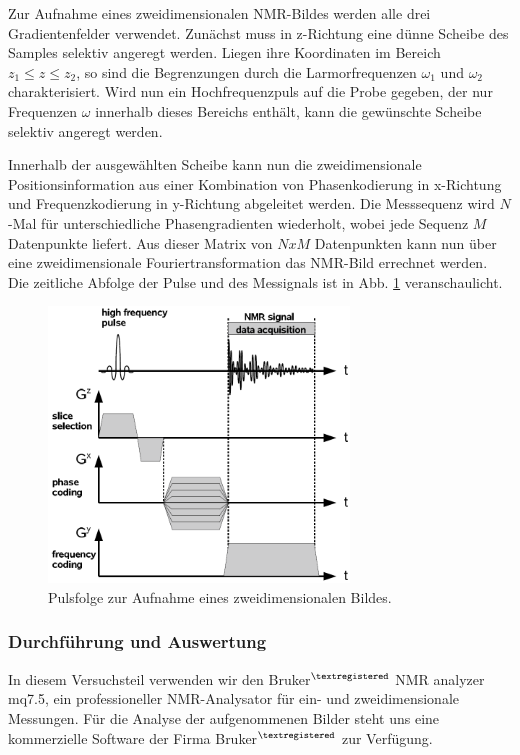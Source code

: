 \documentclass[a4paper]{scrartcl} %
\begin{document}
Zur Aufnahme eines zweidimensionalen NMR-Bildes werden alle drei Gradientenfelder verwendet. Zunächst muss in z-Richtung eine dünne Scheibe des Samples selektiv angeregt werden. Liegen ihre Koordinaten im Bereich $z_1 \leq z \leq z_2$, so sind die Begrenzungen durch die Larmorfrequenzen $\omega_1$ und $\omega_2$ charakterisiert. Wird nun ein Hochfrequenzpuls auf die Probe gegeben, der nur Frequenzen $\omega$ innerhalb dieses Bereichs enthält, kann die gewünschte Scheibe selektiv angeregt werden. 

Innerhalb der ausgewählten Scheibe kann nun die zweidimensionale Positionsinformation aus einer Kombination von Phasenkodierung in x-Richtung und Frequenzkodierung in y-Richtung abgeleitet werden. Die Messsequenz wird $N$-Mal für unterschiedliche Phasengradienten wiederholt, wobei jede Sequenz $M$ Datenpunkte liefert. Aus dieser Matrix von $N x M$ Datenpunkten kann nun über eine zweidimensionale Fouriertransformation das NMR-Bild errechnet werden. Die zeitliche Abfolge der Pulse und des Messignals ist in Abb. \ref{fig:2d_imaging} veranschaulicht.

\begin{figure}[H]
	\centering
	\includegraphics[width=80mm]{./Resources/2d_imaging.png}
	\caption{Pulsfolge zur Aufnahme eines zweidimensionalen Bildes.}
	\label{fig:2d_imaging}
\end{figure}

\subsubsection{Durchführung und Auswertung}

In diesem Versuchsteil verwenden wir den \textsf{Bruker$^{\textregistered}$ NMR analyzer mq7.5}, ein professioneller NMR-Analysator für ein- und zweidimensionale Messungen. Für die Analyse der aufgenommenen Bilder steht uns eine kommerzielle Software der Firma \textsf{Bruker$^{\textregistered}$} zur Verfügung.
\end{document}
